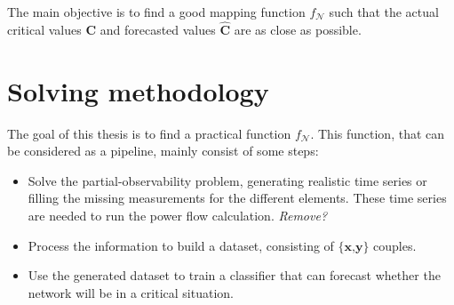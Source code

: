     
    
    

The main objective is to find a good mapping function $f_\mathcal{N}$ such that the actual critical values $\textbf{C}$ and forecasted values $\hat{\textbf{C}}$ are as close as possible.

\section{Solving methodology}
\label{sec:sm}
The goal of this thesis is to find a practical function $f_\mathcal{N}$. This function, that can be considered as a pipeline, mainly consist of some steps:
\begin{itemize}
    \item Solve the partial-observability problem, generating realistic time series or filling the missing measurements for the different elements. These time series are needed to run the power flow calculation. \emph{Remove?}
    \item Process the information to build a dataset, consisting of $\{\textbf{x,y}\}$ couples.
    \item Use the generated dataset to train a classifier that can forecast whether the network will be in a critical situation.
\end{itemize}

